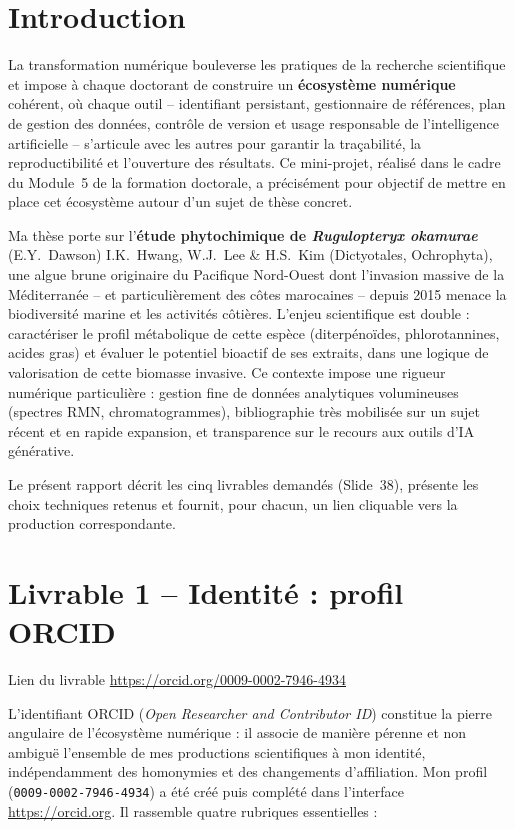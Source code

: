 \documentclass[11pt,a4paper]{article}
\begin{document}
\section{Introduction}
La transformation numérique bouleverse les pratiques de la recherche scientifique et
impose à chaque doctorant de construire un \textbf{écosystème numérique} cohérent, où
chaque outil -- identifiant persistant, gestionnaire de références, plan de gestion
des données, contrôle de version et usage responsable de l'intelligence artificielle --
s'articule avec les autres pour garantir la traçabilité, la reproductibilité et
l'ouverture des résultats. Ce mini-projet, réalisé dans le cadre du Module~5 de la
formation doctorale, a précisément pour objectif de mettre en place cet écosystème
autour d'un sujet de thèse concret.

Ma thèse porte sur l'\textbf{étude phytochimique de \textit{Rugulopteryx okamurae}}
(E.Y.~Dawson) I.K.~Hwang, W.J.~Lee \& H.S.~Kim (Dictyotales, Ochrophyta), une algue
brune originaire du Pacifique Nord-Ouest dont l'invasion massive de la Méditerranée --
et particulièrement des côtes marocaines -- depuis 2015 menace la biodiversité
marine et les activités côtières. L'enjeu scientifique est double : caractériser le
profil métabolique de cette espèce (diterpénoïdes, phlorotannines, acides gras) et
évaluer le potentiel bioactif de ses extraits, dans une logique de valorisation de
cette biomasse invasive. Ce contexte impose une rigueur numérique particulière :
gestion fine de données analytiques volumineuses (spectres RMN, chromatogrammes),
bibliographie très mobilisée sur un sujet récent et en rapide expansion, et
transparence sur le recours aux outils d'IA générative.

Le présent rapport décrit les cinq livrables demandés (Slide~38), présente les
choix techniques retenus et fournit, pour chacun, un lien cliquable vers la
production correspondante.

\section{Livrable 1 -- Identité : profil ORCID}
\begin{lienbox}{Lien du livrable}
\href{https://orcid.org/0009-0002-7946-4934}{https://orcid.org/0009-0002-7946-4934}
\end{lienbox}

L'identifiant ORCID (\textit{Open Researcher and Contributor ID}) constitue la
pierre angulaire de l'écosystème numérique : il associe de manière pérenne et
non ambiguë l'ensemble de mes productions scientifiques à mon identité, indépendamment
des homonymies et des changements d'affiliation. Mon profil
(\texttt{0009-0002-7946-4934}) a été créé puis complété dans l'interface
\url{https://orcid.org}. Il rassemble quatre rubriques essentielles :
\end{document}
